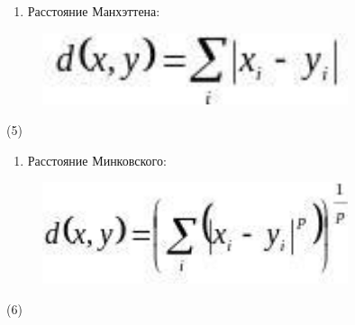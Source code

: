 \begin{enumerate}
\def\labelenumi{\arabic{enumi}.}
\setcounter{enumi}{1}
\item
  Расстояние Манхэттена:
\end{enumerate}

\begin{figure}[H]
	\centering
	\includegraphics[width=0.8\textwidth]{assets/96}
	\caption*{}
\end{figure} (5)

\begin{enumerate}
\def\labelenumi{\arabic{enumi}.}
\setcounter{enumi}{2}
\item
  Расстояние Минковского:
\end{enumerate}

\begin{figure}[H]
	\centering
	\includegraphics[width=0.8\textwidth]{assets/97}
	\caption*{}
\end{figure} (6)

